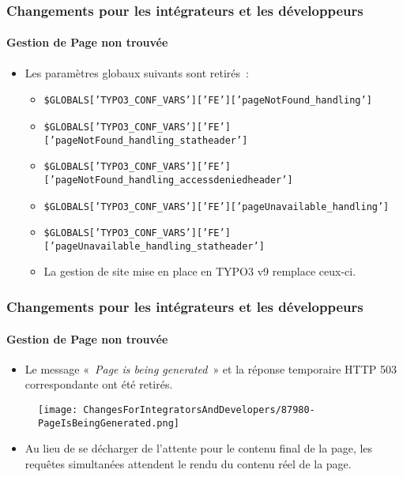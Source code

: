 \begin{frame}[fragile]
	\frametitle{Changements pour les intégrateurs et les développeurs}
	\framesubtitle{Gestion de Page non trouvée}

	\begin{itemize}

		\item Les paramètres globaux suivants sont retirés~:

			\begin{itemize}
				\item {\fontsize{7}{8}\selectfont\texttt{\$GLOBALS['TYPO3\_CONF\_VARS']['FE']['pageNotFound\_handling']}}
				\item {\fontsize{7}{8}\selectfont\texttt{\$GLOBALS['TYPO3\_CONF\_VARS']['FE']['pageNotFound\_handling\_statheader']}}
				\item {\fontsize{7}{8}\selectfont\texttt{\$GLOBALS['TYPO3\_CONF\_VARS']['FE']['pageNotFound\_handling\_accessdeniedheader']}}
				\item {\fontsize{7}{8}\selectfont\texttt{\$GLOBALS['TYPO3\_CONF\_VARS']['FE']['pageUnavailable\_handling']}}
				\item {\fontsize{7}{8}\selectfont\texttt{\$GLOBALS['TYPO3\_CONF\_VARS']['FE']['pageUnavailable\_handling\_statheader']}}
			\end{itemize}

			\begin{itemize}\smaller
				\item[\ding{228}] La gestion de site mise en place en TYPO3 v9 remplace ceux-ci.
			\end{itemize}\normalsize

	\end{itemize}

\end{frame}


\begin{frame}[fragile]
	\frametitle{Changements pour les intégrateurs et les développeurs}
	\framesubtitle{Gestion de Page non trouvée}

	\begin{itemize}

		\item Le message «~\textit{Page is being generated}~» et la réponse temporaire
			HTTP 503 correspondante ont été retirés.
	\end{itemize}

	\begin{figure}
		\texttt{[image: ChangesForIntegratorsAndDevelopers/87980-PageIsBeingGenerated.png]}
	\end{figure}

	\begin{itemize}
		\item Au lieu de se décharger de l'attente pour le contenu final de la page,
			les requêtes simultanées attendent le rendu du contenu réel de la page.
	\end{itemize}

\end{frame}

